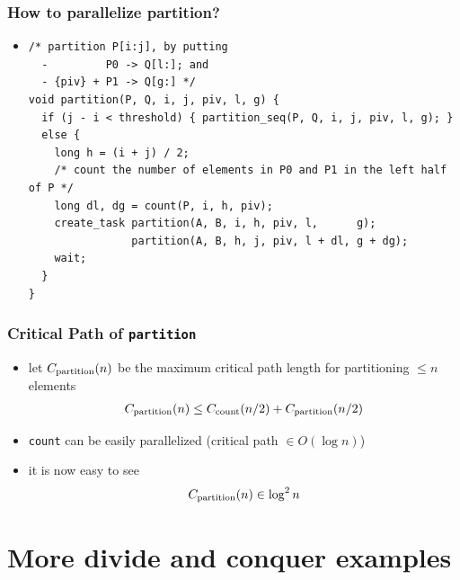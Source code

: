 \documentclass[12pt,dvipdfmx]{beamer}
\begin{document}
\begin{frame}[fragile]
  \frametitle{How to parallelize partition?}
  \begin{itemize}
  \item []
\begin{lstlisting}
/* partition P[i:j], by putting
  -         P0 -> Q[l:]; and
  - {piv} + P1 -> Q[g:] */
void partition(P, Q, i, j, piv, l, g) {
  if (j - i < threshold) { partition_seq(P, Q, i, j, piv, l, g); }
  else {
    long h = (i + j) / 2;
    /* count the number of elements in P0 and P1 in the left half of P */
    long dl, dg = count(P, i, h, piv);
    create_task partition(A, B, i, h, piv, l,      g);
                partition(A, B, h, j, piv, l + dl, g + dg);
    wait;
  }
}      
\end{lstlisting}
\end{itemize}

\begin{center}
\def\svgwidth{0.7\textwidth}
%
%
\end{center}
\end{frame}

\begin{frame}[fragile]
  \frametitle{Critical Path of {\tt partition}}
  \begin{itemize}
  \item [] let $C_{\mbox{\scriptsize partition}}(n)$ be the maximum critical path length for partitioning $\leq n$ elements
\[ 
\begin{array}{l}
  C_{\mbox{\scriptsize partition}}(n) \leq C_{\mbox{\scriptsize count}}(n/2) +
  C_{\mbox{\scriptsize partition}}(n/2) 
\end{array}
\]
\item {\tt count} can be easily parallelized (critical path $\in O(\log n)$)
\item it is now easy to see 
  \[ C_{\mbox{\scriptsize partition}}(n) \in \log^2 n \]
  \end{itemize}
\end{frame}


\section{More divide and conquer examples}

\end{document}
